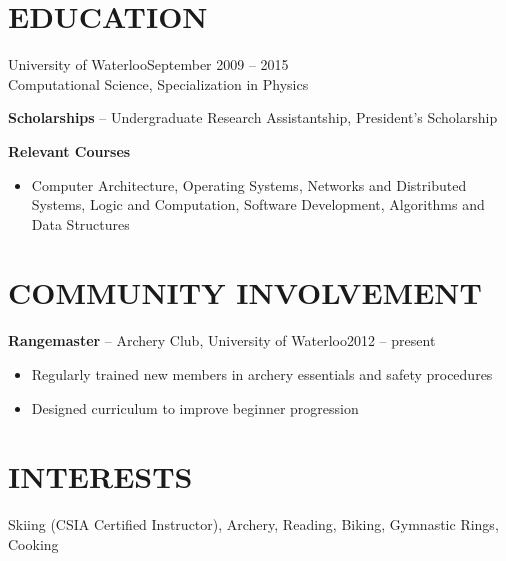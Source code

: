 \documentclass{res}
\begin{document}
\begin{resume}
\section{EDUCATION}          
  \vspace{3mm}
    University of Waterloo\hfill September 2009 -- 2015\\
    Computational Science, Specialization in Physics
    \vspace{-3mm}
    
    {\bf Scholarships} -- Undergraduate Research Assistantship, President's Scholarship
    \vspace{-3mm}
    
    {\bf Relevant Courses}
      \vspace{1mm}
      \begin{itemize}
       \item Computer Architecture, Operating Systems, Networks and Distributed Systems, Logic and Computation, Software Development, Algorithms and Data Structures
      \end{itemize}
    
    
\section{COMMUNITY INVOLVEMENT}
    \vspace{3mm}
    {\bf Rangemaster} -- Archery Club, University of Waterloo\hfill 2012 -- present\\
    \vspace{-2mm}
   \begin{itemize}
    \item Regularly trained new members in archery essentials and safety procedures
    \item Designed curriculum to improve beginner progression
   \end{itemize}
   
\section{INTERESTS}
  \vspace{1mm}
  Skiing (CSIA Certified Instructor), Archery, Reading, Biking, Gymnastic Rings, Cooking
  
 
\end{resume}
\end{document}
